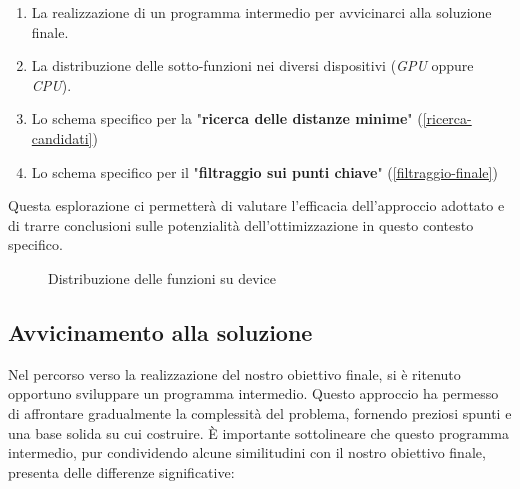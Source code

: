 \documentclass[12pt,a4paper]{report}
\begin{document}
\begin{enumerate}
    \item La realizzazione di un programma intermedio per avvicinarci alla soluzione finale.
    \item La distribuzione delle sotto-funzioni nei diversi dispositivi (\textit{GPU} oppure \textit{CPU}).
    \item Lo schema specifico per la "\textbf{ricerca delle distanze minime}" (\ref{ricerca-candidati})
    \item Lo schema specifico per il "\textbf{filtraggio sui punti chiave}" (\ref{filtraggio-finale})
\end{enumerate}

Questa esplorazione ci permetterà di valutare l'efficacia dell'approccio adottato e di trarre conclusioni sulle potenzialità dell'ottimizzazione in questo contesto specifico.

\begin{figure}[H]
    \centering
    \caption{Distribuzione delle funzioni su device}
\end{figure}

\subsection{Avvicinamento alla soluzione}

Nel percorso verso la realizzazione del nostro obiettivo finale, si è ritenuto opportuno sviluppare un programma intermedio. Questo approccio ha permesso di affrontare gradualmente la complessità del problema, fornendo preziosi spunti e una base solida su cui costruire.
È importante sottolineare che questo programma intermedio, pur condividendo alcune similitudini con il nostro obiettivo finale, presenta delle differenze significative:
\end{document}
